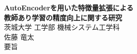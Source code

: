 \begin{center}
  \textbf{{\LARGE AutoEncoderを用いた特徴量拡張による\\教師あり学習の精度向上に関する研究\\}}
  \vspace{5mm}
  {\large 茨城大学 工学部 機械システム工学科\\
  佐藤 竜太\\}
  \vspace{5mm}
  {\large 要旨}
  \vspace{5mm}
\end{center}


\newpage

